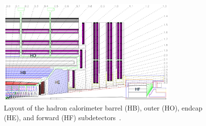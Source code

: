 \begin{figure}
\centering
\includegraphics[width=0.8\textwidth]{figures/lhc_and_cms/hcal_layout.png}
\caption{Layout of the hadron calorimeter barrel (HB), outer (HO), endcap (HE), and forward (HF) subdetectors~\cite{cms_experiment}.}
\label{hcal_layout}
\end{figure}